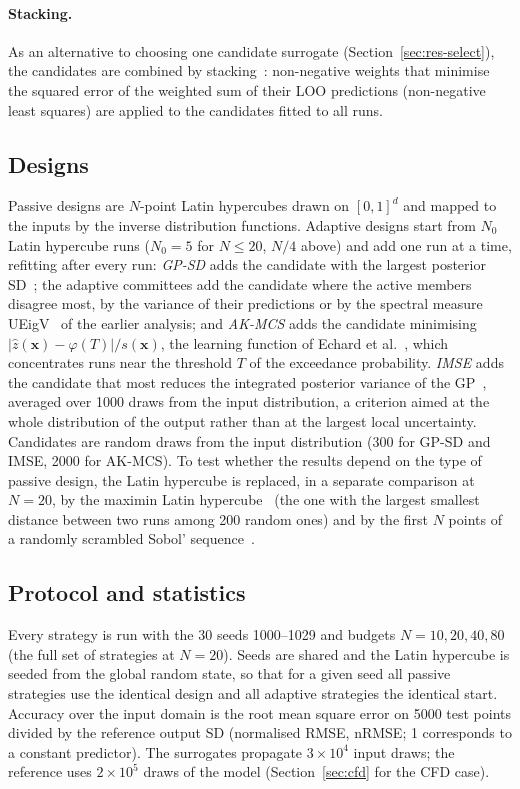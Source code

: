 \paragraph{Stacking.} As an alternative to choosing one candidate surrogate
(Section~\ref{sec:res-select}), the candidates are combined by
stacking~\cite{breiman1996}: non-negative weights that minimise the squared
error of the weighted sum of their LOO predictions (non-negative least
squares) are applied to the candidates fitted to all runs.

\subsection{Designs}
Passive designs are $N$-point Latin hypercubes drawn on $[0,1]^d$ and mapped
to the inputs by the inverse distribution functions. Adaptive designs start
from $N_0$ Latin hypercube runs ($N_0=5$ for $N\le20$, $N/4$ above) and add
one run at a time, refitting after every run: \emph{GP-SD} adds the
candidate with the largest posterior SD~\cite{gramacy2009}; the adaptive
committees add the candidate where the active members disagree most, by the
variance of their predictions or by the spectral measure
UEigV~\cite{lin2024} of the earlier analysis; and \emph{AK-MCS} adds the
candidate minimising $|\hat z(\mathbf x)-\varphi(T)|/s(\mathbf x)$, the
learning function of Echard et al.~\cite{echard2011}, which concentrates
runs near the threshold $T$ of the exceedance probability. \emph{IMSE}
adds the candidate that most reduces the integrated posterior variance of
the GP~\cite{sacks1989}, averaged over 1000 draws from the input
distribution, a criterion aimed at the whole distribution of the output
rather than at the largest local uncertainty. Candidates are random draws
from the input distribution (300 for GP-SD and IMSE, 2000 for AK-MCS).
To test whether the results depend on the type of passive design, the
Latin hypercube is replaced, in a separate comparison at $N=20$, by the
maximin Latin hypercube~\cite{morris1995} (the one with the largest
smallest distance between two runs among 200 random ones) and by the first
$N$ points of a randomly scrambled Sobol' sequence~\cite{sobol1967}.

\subsection{Protocol and statistics}
Every strategy is run with the 30 seeds 1000--1029 and budgets
$N=10,20,40,80$ (the full set of strategies at $N=20$). Seeds are shared and
the Latin hypercube is seeded from the global random state, so that for a
given seed all passive strategies use the identical design and all adaptive
strategies the identical start. Accuracy over the input domain is the root
mean square error on 5000 test points divided by the reference output SD
(normalised RMSE, nRMSE; 1 corresponds to a constant predictor). The
surrogates propagate $3\times10^4$ input draws; the reference uses
$2\times10^5$ draws of the model (Section~\ref{sec:cfd} for the CFD case).

